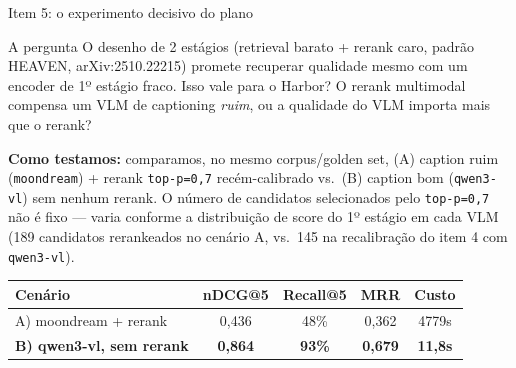 \documentclass{beamer}
\newenvironment{numerobloco}[1]{\begin{block}{#1}}{\end{block}}
\begin{document}
\begin{frame}{Item 5: o experimento decisivo do plano}
  \small
  \begin{numerobloco}{A pergunta}
    O desenho de 2 estágios (retrieval barato + rerank caro, padrão HEAVEN,
    arXiv:2510.22215) promete recuperar qualidade mesmo com um encoder de 1º estágio
    fraco. Isso vale para o Harbor? O rerank multimodal compensa um VLM de captioning
    \emph{ruim}, ou a qualidade do VLM importa mais que o rerank?
  \end{numerobloco}

  \pause
  \textbf{Como testamos:} comparamos, no mesmo corpus/golden set, (A) caption ruim
  (\texttt{moondream}) + rerank \texttt{top-p=0,7} recém-calibrado vs.\ (B) caption bom
  (\texttt{qwen3-vl}) sem nenhum rerank. O número de candidatos selecionados pelo
  \texttt{top-p=0,7} não é fixo — varia conforme a distribuição de score do 1º estágio
  em cada VLM (189 candidatos rerankeados no cenário A, vs.\ 145 na recalibração do
  item 4 com \texttt{qwen3-vl}).

  \pause
  \begin{center}
  \footnotesize
  \begin{tabular}{lcccc}
    \toprule
    \textbf{Cenário} & \textbf{nDCG@5} & \textbf{Recall@5} & \textbf{MRR} & \textbf{Custo} \\
    \midrule
    A) moondream + rerank & 0,436          & 48\%          & 0,362          & 4779s \\
    \textbf{B) qwen3-vl, sem rerank} & \textbf{0,864} & \textbf{93\%} & \textbf{0,679} & \textbf{11,8s} \\
    \bottomrule
  \end{tabular}
  \end{center}
\end{frame}
\end{document}
